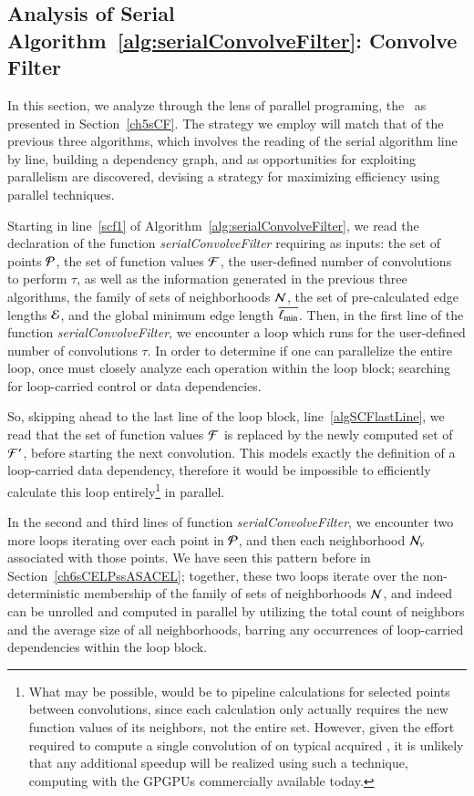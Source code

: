 %
%
\subsection{Analysis of Serial Algorithm~\ref{alg:serialConvolveFilter}: Convolve Filter}
\label{ch6sCFPssASACF}
In this section, we analyze through the lens of parallel programing, the~ as presented in Section~\ref{ch5sCF}. The strategy we employ will match that of the previous three algorithms, which involves the reading of the serial algorithm line by line, building a dependency graph, and as opportunities for exploiting parallelism are discovered, devising a strategy for maximizing efficiency using parallel techniques.

Starting in line~\ref{scf1} of Algorithm~\ref{alg:serialConvolveFilter}, we read the declaration of the function \textit{serialConvolveFilter} requiring as inputs: the set of points $\mathcal{P}$, the set of function values $\mathcal{F}$, the user-defined number of convolutions to perform $\tau$, as well as the information generated in the previous three algorithms, the family of sets of neighborhoods $\mathcal{N}$, the set of pre-calculated edge lengths $\mathcal{E}$, and the global minimum edge length $\overline{\ell_\text{min}}$. Then, in the first line of the function \textit{serialConvolveFilter}, we encounter a loop which runs for the user-defined number of convolutions $\tau$. In order to determine if one can parallelize the entire loop, once must closely analyze each operation within the loop block; searching for loop-carried control or data dependencies.

So, skipping ahead to the last line of the loop block, line~\ref{algSCFlastLine}, we read that the set of function values $\mathcal{F}$ is replaced by the newly computed set of  $\mathcal{F}'$, before starting the next convolution. This models exactly the definition of a loop-carried data dependency, therefore it would be impossible to efficiently calculate this loop entirely\footnote{What may be possible, would be to pipeline calculations for selected points between convolutions, since each calculation only actually requires the new function values of its neighbors, not the entire set. However, given the effort required to compute a single convolution of  on typical acquired \tdd{}, it is unlikely that any additional speedup will be realized using such a technique, computing with the GPGPUs commercially available today.} in parallel.

In the second and third lines of function \textit{serialConvolveFilter}, we encounter two more loops iterating over each point in $\mathcal{P}$, and then each neighborhood $\mathcal{N}_v$ associated with those points. We have seen this pattern before in Section~\ref{ch6sCELPssASACEL}; together, these two loops iterate over the non-deterministic membership of the family of sets of neighborhoods $\mathcal{N}$, and indeed can be unrolled and computed in parallel by utilizing the total count of neighbors and the average size of all neighborhoods, barring any occurrences of loop-carried dependencies within the loop block.

